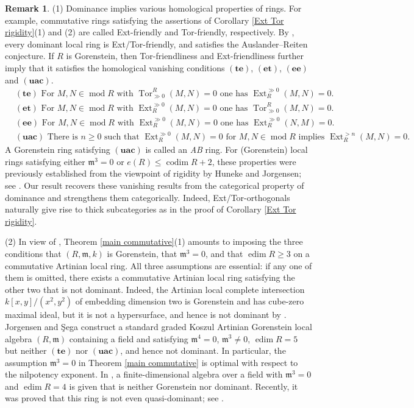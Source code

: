 \documentclass{amsart}
\theoremstyle{definition}
\newtheorem{rem}[thm]{Remark}
\theoremstyle{remark}
\numberwithin{equation}{thm}
\def\codim{\operatorname{codim}}
\def\edim{\operatorname{edim}}
\def\Ext{\operatorname{Ext}}
\def\ge{\geqslant}
\def\m{\mathfrak{m}}
\def\mod{\operatorname{mod}}
\def\Tor{\operatorname{Tor}}
\begin{document}
\begin{rem}
(1) Dominance implies various homological properties of rings. For example, commutative rings satisfying the assertions of Corollary \ref{Ext Tor rigidity}(1) and (2) are called Ext-friendly and Tor-friendly, respectively.
By \cite[Theorem 6.7]{T23}, every dominant local ring is Ext/Tor-friendly, and satisfies the Auslander--Reiten conjecture. If $R$ is Gorenstein, then Tor-friendliness and Ext-friendliness further imply that it satisfies the homological vanishing conditions $(\mathbf{te})$, $(\mathbf{et})$, $(\mathbf{ee})$ and $(\mathbf{uac})$.
\begin{align*}
&\text{$(\mathbf{te})$ For $M,N\in\mod R$ with $\Tor_{\gg0}^R(M,N)=0$ one has $\Ext_R^{\gg0}(M,N)=0$.} \\
&\text{$(\mathbf{et})$ For $M,N\in\mod R$ with $\Ext_R^{\gg0}(M,N)=0$ one has $\Tor_{\gg0}^R(M,N)=0$.} \\
&\text{$(\mathbf{ee})$ For $M,N\in\mod R$ with $\Ext_R^{\gg0}(M,N)=0$ one has $\Ext_R^{\gg0}(N,M)=0$.} \\
&\text{$(\mathbf{uac})$ There is $n\ge 0$ such that $\Ext_R^{\gg0}(M,N)=0$ for $M,N\in\mod R$ implies $\Ext_R^{>n}(M,N)=0$.}
\end{align*}
A Gorenstein ring satisfying $(\mathbf{uac})$ is called an \textit{AB} ring.
For (Gorenstein) local rings satisfying either $\m^3=0$ or $e(R)\leq \codim R+2$, these properties were previously established from the viewpoint of rigidity by Huneke and Jorgensen; see \cite[Theorem 3.6 and Lemma 3.7]{HJ}. 
Our result recovers these vanishing results from the categorical property of dominance and strengthens them categorically.
Indeed, Ext/Tor-orthogonals naturally give rise to thick subcategories as in the proof of  Corollary \ref{Ext Tor rigidity}.

(2) In view of \cite[Lemma 7.2(1)]{KT}, Theorem \ref{main commutative}(1) amounts to imposing the three conditions that $(R,\m,k)$ is Gorenstein, that $\m^3=0$, and that $\edim R\ge 3$ on a commutative Artinian local ring. All three assumptions are essential: if any one of them is omitted, there exists a commutative Artinian local ring satisfying the other two that is not dominant.
Indeed, the Artinian local complete intersection $k[x,y]/(x^2,y^2)$ of embedding dimension two is Gorenstein and has cube-zero maximal ideal, but it is not a hypersurface, and hence is not dominant by \cite[Proposition 6.2(3)]{T23}.
Jorgensen and \c{S}ega \cite{JS} construct a standard graded Koszul Artinian Gorenstein local algebra $(R,\m)$ containing a field and satisfying $\m^4=0$, $\m^3\ne 0$, $\edim R=5$ but neither $(\mathbf{te})$ nor $(\mathbf{uac})$, and hence not dominant. In particular, the assumption $\m^3=0$ in Theorem \ref{main commutative} is optimal with respect to the nilpotency exponent.
In \cite[Remark 9.8]{T23}, a finite-dimensional algebra over a field with $\m^3=0$ and $\edim R=4$ is given that is neither Gorenstein nor dominant.
Recently, it was proved that this ring is not even quasi-dominant; see \cite[Theorem 5.7]{KMOT}.
\end{rem}
\end{document}
